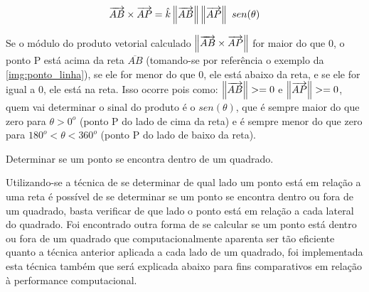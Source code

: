\begin{alineas}[leftmargin=0pt, itemindent=20pt, labelwidth=15pt, labelsep=5pt, listparindent=1.25cm, align=left]
    \begin{equation}
        \label{eq:produto_vetorial}
        \overrightarrow{AB} \times \overrightarrow{AP} = \hat{k} \, \norm{\overrightarrow{AB}} \, \norm{\overrightarrow{AP}}\ \, sen(\theta)
    \end{equation}
   
    Se o módulo do produto vetorial calculado $\norm{\overrightarrow{AB} \times \overrightarrow{AP}}$ for maior do que 0, o ponto P está acima da reta $\overline{AB}$ (tomando-se por referência o exemplo da \autoref{img:ponto_linha}), se ele for menor do que 0, ele está abaixo da reta, e se ele for igual a 0, ele está na reta. Isso ocorre pois como: $\norm{\overrightarrow{AB}} >= 0$ e $\norm{\overrightarrow{AP}} >= 0$, quem vai determinar o sinal do produto é o $sen(\theta)$, que é sempre maior do que zero para $\theta > 0^o$ (ponto P do lado de cima da reta) e é sempre menor do que zero para $180^o < \theta < 360^o$ (ponto P do lado de baixo da reta).
    
    \item Determinar se um ponto se encontra dentro de um quadrado.
    
    Utilizando-se a técnica de se determinar de qual lado um ponto está em relação a uma reta é possível de se determinar se um ponto se encontra dentro ou fora de um quadrado, basta verificar de que lado o ponto está em relação a cada lateral do quadrado. Foi encontrado outra forma de se calcular se um ponto está dentro ou fora de um quadrado que computacionalmente aparenta ser tão eficiente quanto a técnica anterior aplicada a cada lado de um quadrado, foi implementada esta técnica também que será explicada abaixo para fins comparativos em relação à performance computacional.
   

\end{alineas}
